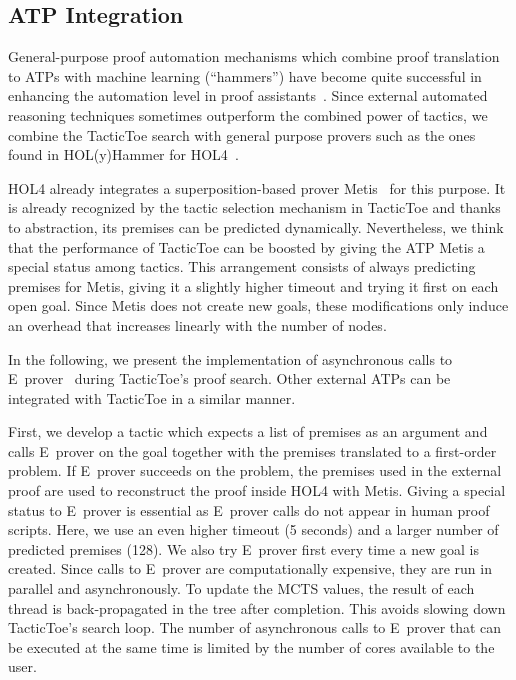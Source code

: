 \documentclass[runningheads,a4paper,draft]{svjour3}
\def\holfour{\textsf{HOL4}\xspace}
\def\eprover{\textsf{E~prover}\xspace}
\def\holyhammer{\textsf{HOL(y)Hammer}\xspace}
\def\metis{\textsf{Metis}\xspace}
\def\tactictoe{\textsf{TacticToe}\xspace}
\begin{document}
\subsection{ATP Integration}\label{sec:atp}
General-purpose proof automation mechanisms which combine proof translation to
ATPs with machine learning (``hammers'') have become quite successful in
enhancing the automation level in proof assistants~\cite{hammers4qed}.
Since external automated reasoning techniques sometimes outperform the combined
power of tactics, we combine the \tactictoe search with
general purpose provers such as the ones found in \holyhammer for
\holfour~\cite{tgck-cpp15}.

\holfour already integrates a superposition-based prover \metis~\cite{metis} 
for this purpose. It is already
recognized by the tactic selection mechanism in \tactictoe and thanks to 
abstraction, its
premises can be predicted dynamically. Nevertheless,
we think that the performance of \tactictoe can be boosted by giving the ATP
\metis a special status among tactics. This arrangement consists of always 
predicting
premises for \metis, giving it a slightly higher timeout and
trying it first on each open goal. Since \metis does not create
new goals, these modifications only induce an overhead that increases linearly 
with the number of nodes.

In the following, we present the implementation of asynchronous calls to 
\eprover~\cite{eprover} during \tactictoe's proof search. 
Other external ATPs can be integrated with \tactictoe in a similar manner.

First, we develop a tactic which expects a list of premises as an
argument and calls \eprover on the goal together with the premises translated 
to a first-order problem. If \eprover
succeeds on the problem, the premises used in the external proof are used to
reconstruct the proof inside \holfour with \metis. Giving a special status
to \eprover is essential as \eprover calls do not appear in human
proof scripts. Here, we use an even higher timeout (5 seconds) and
a larger number of predicted premises (128). We also try \eprover
first every time a new goal is created. Since calls to \eprover are
computationally expensive, they are run in parallel and asynchronously. To 
update the MCTS values, the 
result of each thread is back-propagated in the tree after completion. This
avoids slowing down \tactictoe's search loop. The number of asynchronous calls
to \eprover that can be executed at the same time is limited by the
number of cores available to the user.
\end{document}
